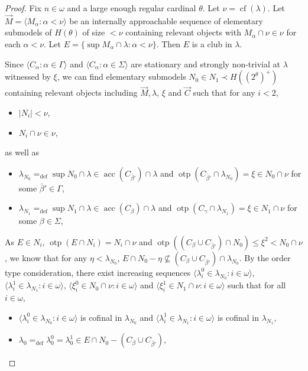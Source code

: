 \documentclass[12pt]{amsart}
\theoremstyle{definition}
\theoremstyle{plain}
\theoremstyle{plain}
\DeclareMathOperator{\cf}{cf}
\DeclareMathOperator{\otp}{otp}
\DeclareMathOperator{\acc}{acc}
\begin{document}
\begin{proof}
Fix $n\in \omega$ and a large enough regular cardinal $\theta$.
Let $\nu=\cf(\lambda)$.
Let $\vec{M}=\langle M_\alpha: \alpha<\nu\rangle$ be an internally approachable sequence of elementary submodels of $H(\theta)$ of size $<\nu$ containing relevant objects with $M_\alpha\cap \nu \in \nu$ for each $\alpha<\nu$. Let $E=\{\sup M_\alpha\cap \lambda: \alpha<\nu\}$. Then $E$ is a club in $\lambda$. 

Since $\langle C_\alpha: \alpha\in \Gamma\rangle$ and $\langle C_\alpha: \alpha\in \Sigma\rangle$ are stationary and strongly non-trivial at $\lambda$ witnessed by $\xi$, we can find elementary submodels $N_0\in N_1\prec H(({2^\theta})^+)$ containing relevant objects including $\vec{M}, \lambda$, $\xi$ and $\vec{C}$ such that for any $i<2$,
	\begin{itemize}
	\item $|N_i|<\nu$,
	\item $N_i\cap \nu \in \nu$,
	\end{itemize}
as well as 
	\begin{itemize}
	\item $\lambda_{N_0}=_{\mathrm{def}}\sup N_0\cap \lambda\in \acc(C_{\bar{\beta}'})\cap \lambda$ and $\otp(C_{\bar{\beta}'} \cap \lambda_{N_0})=\xi\in N_0\cap \nu$ for some $\bar{\beta}'\in \Gamma$,
	\item $\lambda_{N_1}=_{\mathrm{def}}\sup N_1\cap \lambda\in \acc(C_{\beta})\cap \lambda$ and $\otp(C_\gamma \cap \lambda_{N_1})=\xi\in N_1\cap \nu$ for some $\beta\in \Sigma$,
	\end{itemize}
	 As $E\in N_i$, $\otp(E\cap N_i)=N_i\cap \nu$ and $\otp((C_\beta\cup C_{\bar{\beta}'})\cap N_0)\leq \xi^2 < N_0\cap \nu$, we know that for any $\eta<\lambda_{N_0}$, $E\cap N_0 - \eta \not \subseteq (C_\beta\cup C_{\bar{\beta}'}) \cap \lambda_{N_0}$.
By the order type consideration, there exist increasing sequences $\langle \lambda_i^0\in \lambda_{N_0} : i\in \omega\rangle$,  $\langle \lambda_i^1\in \lambda_{N_1} : i\in \omega\rangle$, $\langle \xi_i^0\in N_0\cap \nu: i\in \omega\rangle$ and $\langle \xi_i^1\in N_1\cap \nu: i\in \omega\rangle$ such that for all $i\in \omega$,
	\begin{itemize} 
	\item $\langle \lambda_i^0\in \lambda_{N_0} : i\in \omega\rangle$ is cofinal in $\lambda_{N_0}$ and $\langle \lambda_i^1\in \lambda_{N_1} : i\in \omega\rangle$ is cofinal in $\lambda_{N_1}$,
	\item $\lambda_0=_{\mathrm{def}}\lambda^0_0=\lambda^1_0\in E\cap N_0 - (C_\beta\cup C_{\bar{\beta}'})$,

\end{itemize}
\end{proof}
\end{document}
